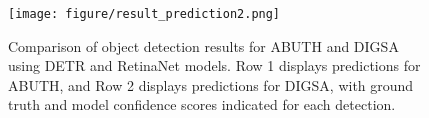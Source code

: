 

\begin{figure}[t]
    \centering
    \texttt{[image: figure/result\_prediction2.png]}
    \vspace{-0.4cm}
    \caption{Comparison of object detection results for ABUTH and DIGSA using DETR and RetinaNet models. Row 1 displays predictions for ABUTH, and Row 2 displays predictions for DIGSA, with ground truth and model confidence scores indicated for each detection.}
    \label{fig:detectionresult}
    \vspace{-0.3cm}
\end{figure}


